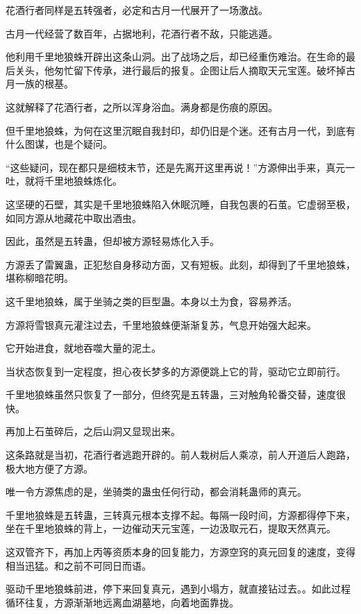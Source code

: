 \begin{this_body}
花酒行者同样是五转强者，必定和古月一代展开了一场激战。

古月一代经营了数百年，占据地利，花酒行者不敌，只能逃遁。

他利用千里地狼蛛开辟出这条山洞。出了战场之后，却已经重伤难治。在生命的最后关头，他匆忙留下传承，进行最后的报复。企图让后人摘取天元宝莲。破坏掉古月一族的根基。

这就解释了花酒行者，之所以浑身浴血。满身都是伤痕的原因。

但千里地狼蛛，为何在这里沉眠自我封印，却仍旧是个迷。还有古月一代，到底有什么图谋，也是个疑问。

“这些疑问，现在都只是细枝末节，还是先离开这里再说！”方源伸出手来，真元一吐，就将千里地狼蛛炼化。

这坚硬的石壁，其实是千里地狼蛛陷入休眠沉睡，自我包裹的石茧。它虚弱至极，如同方源从地藏花中取出酒虫。

因此，虽然是五转蛊，但却被方源轻易炼化入手。

方源丢了雷翼蛊，正犯愁自身移动方面，又有短板。此刻，却得到了千里地狼蛛，堪称柳暗花明。

这千里地狼蛛，属于坐骑之类的巨型蛊。本身以土为食，容易养活。

方源将雪银真元灌注过去，千里地狼蛛便渐渐复苏，气息开始强大起来。

它开始进食，就地吞噬大量的泥土。

当状态恢复到一定程度，担心夜长梦多的方源便跳上它的背，驱动它立即前行。

千里地狼蛛虽然只恢复了一部分，但终究是五转蛊，三对触角轮番交替，速度很快。

再加上石茧碎后，之后山洞又显现出来。

这条路就是当初，花酒行者逃跑开辟的。前人栽树后人乘凉，前人开道后人跑路，极大地方便了方源。

唯一令方源焦虑的是，坐骑类的蛊虫任何行动，都会消耗蛊师的真元。

千里地狼蛛是五转蛊，三转真元根本支撑不起。每隔一段时间，方源都得停下来，坐在千里地狼蛛的背上，一边催动天元宝莲，一边汲取元石，提取天然真元。

这双管齐下，再加上丙等资质本身的回复能力，方源空窍的真元回复的速度，变得相当迅猛。和之前不可同日而语。

驱动千里地狼蛛前进，停下来回复真元，遇到小塌方，就直接钻过去。。如此过程循环往复，方源渐渐地远离血湖墓地，向着地面靠拢。

\end{this_body}

